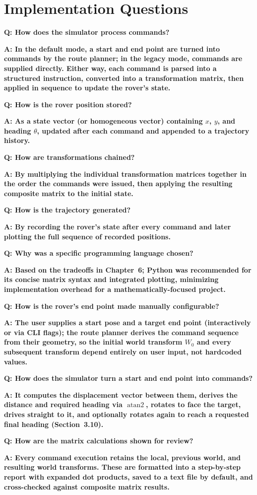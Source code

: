 \documentclass[12pt]{report}
\newcommand{\headingfont}{\sffamily}
\newcommand{\qanda}[2]{
  \par\vspace{4pt}\noindent\headingfont\bfseries\color{HUPurple}Q: \normalfont\color{HUDark}#1\par
  \noindent\headingfont\bfseries\color{HUGold}A: \normalfont\color{black}#2\par\vspace{2pt}
}
\begin{document}
\section{Implementation Questions}
\qanda{How does the simulator process commands?}{In the default mode, a start and end point are turned into commands by the route planner; in the legacy mode, commands are supplied directly. Either way, each command is parsed into a structured instruction, converted into a transformation matrix, then applied in sequence to update the rover's state.}
\qanda{How is the rover position stored?}{As a state vector (or homogeneous vector) containing $x$, $y$, and heading $\theta$, updated after each command and appended to a trajectory history.}
\qanda{How are transformations chained?}{By multiplying the individual transformation matrices together in the order the commands were issued, then applying the resulting composite matrix to the initial state.}
\qanda{How is the trajectory generated?}{By recording the rover's state after every command and later plotting the full sequence of recorded positions.}
\qanda{Why was a specific programming language chosen?}{Based on the tradeoffs in Chapter~6; Python was recommended for its concise matrix syntax and integrated plotting, minimizing implementation overhead for a mathematically-focused project.}
\qanda{How is the rover's end point made manually configurable?}{The user supplies a start pose and a target end point (interactively or via CLI flags); the route planner derives the command sequence from their geometry, so the initial world transform $W_0$ and every subsequent transform depend entirely on user input, not hardcoded values.}
\qanda{How does the simulator turn a start and end point into commands?}{It computes the displacement vector between them, derives the distance and required heading via $\operatorname{atan2}$, rotates to face the target, drives straight to it, and optionally rotates again to reach a requested final heading (Section~3.10).}
\qanda{How are the matrix calculations shown for review?}{Every command execution retains the local, previous world, and resulting world transforms. These are formatted into a step-by-step report with expanded dot products, saved to a text file by default, and cross-checked against composite matrix results.}
\end{document}
